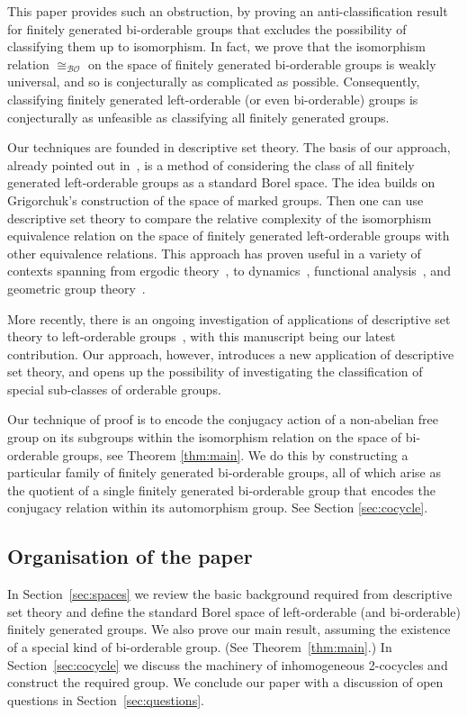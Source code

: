 \documentclass{amsart}
\theoremstyle{definition}
\theoremstyle{remark}
\begin{document}
This paper provides such an obstruction, by proving an anti-classification result for finitely generated bi-orderable groups that excludes the possibility of classifying them up to isomorphism. In fact, we prove
that the isomorphism relation  \(\cong_\mathcal{BO}\) on the space of finitely generated bi-orderable groups is weakly universal, and so is conjecturally as complicated as possible. Consequently, classifying finitely generated left-orderable (or even bi-orderable) groups is conjecturally as unfeasible as classifying all finitely generated groups.
 
Our techniques are founded in descriptive set theory. The basis of our approach, already pointed out in~\cite{GolKunLod}, is  a method of considering the class of all finitely generated left-orderable groups as a standard Borel space. The idea builds on Grigorchuk's construction of the space of marked groups. Then one can use descriptive set theory to compare the relative complexity of the isomorphism equivalence relation on the space of finitely generated left-orderable groups with other equivalence relations. This approach has proven useful in a variety of contexts spanning from ergodic theory~\cite{ForRudWei,ForWei, ForWei22}, to dynamics~\cite{DekKwiPenSab}, functional analysis~\cite{CamGao,FerLouRos, Sab16}, and geometric group theory~\cite{OsiOya, Tho08}.  

More recently, there is an ongoing investigation of applications of descriptive set theory to left-orderable groups~\cite{CalCla22,CalCla24a,CalCla24b, CalSha,GolKunLod,Mol,Pou25, HoKhaRos}, with this manuscript being our latest contribution. Our approach, however, introduces a new application of descriptive set theory, and opens up the possibility of investigating the classification of special sub-classes of orderable groups. 

Our technique of proof is to encode the conjugacy action of a non-abelian free group on its subgroups within the isomorphism relation on the space of bi-orderable groups, see Theorem \ref{thm:main}.  We do this by constructing a particular family of finitely generated bi-orderable groups, all of which arise as the quotient of a single finitely generated bi-orderable group that encodes the conjugacy relation within its automorphism group.  See Section \ref{sec:cocycle}.



\subsection{Organisation of the paper}
In Section~\ref{sec:spaces} we review the basic background required from descriptive set theory and define the standard Borel space of left-orderable (and bi-orderable) finitely generated groups.  We also prove our main result, assuming the existence of a special kind of bi-orderable group. (See Theorem~\ref{thm:main}.) In Section~\ref{sec:cocycle} we discuss the machinery of inhomogeneous 2-cocycles and construct the required group. We conclude our paper with a discussion of open questions in Section~\ref{sec:questions}.
\end{document}
